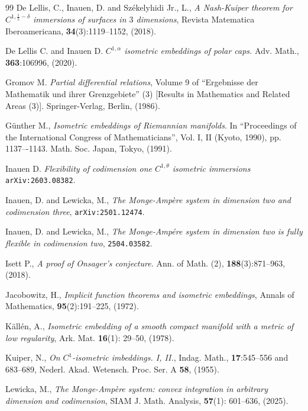 \documentclass[reqno,twoside,11pt]{amsart}
\numberwithin{equation}{section}
\theoremstyle{plain}
\theoremstyle{definition}
\begin{document}
\begin{thebibliography}{99}
 {\sc De Lellis, C., Inauen, D. and Sz\'ekelyhidi Jr.,
    L.}, {\em A Nash-Kuiper theorem for $C^{1,\frac{1}{5}-\delta}$ immersions of
surfaces in $3$ dimensions}, Revista Matematica Iberoamericana, {\bf
34}(3):1119--1152, (2018).

 {\sc De Lellis C. and Inauen D.}
 {\em $C^{1,\alpha}$ isometric embeddings of polar caps.}
 Adv. Math., {\bf 363}:106996, (2020).

 {\sc Gromov M.}
{\em Partial differential relations}, 
Volume 9 of ``Ergebnisse der Mathematik und ihrer
Grenzgebiete'' (3) [Results in Mathematics and Related Areas
(3)]. Springer-Verlag, Berlin, (1986).

 {\sc G\"unther M.},
{\em Isometric embeddings of Riemannian manifolds}. 
In ``Proceedings of the International
Congress of Mathematicians'', Vol. I, II (Kyoto, 1990), pp. 1137–-1143. Math. Soc. Japan, Tokyo,
(1991). 

 {\sc Inauen D.}
{\em Flexibility of codimension one $C^{1,\theta}$ isometric immersions}
{\tt arXiv:2603.08382}.

 {\sc Inauen, D. and Lewicka, M.},
{\em The Monge-Amp\`ere system in dimension two and codimension
  three}, {\tt arXiv:2501.12474}.
  
 {\sc Inauen, D. and Lewicka, M.},
{\em The Monge-Amp\'ere system in dimension two is fully flexible in
  codimension two}, {\tt 2504.03582}.

 {\sc Isett P.}, {\em A proof of Onsager’s conjecture.}
Ann. of Math. (2), {\bf 188}(3):871--963, (2018).

 {\sc Jacobowitz, H.}, {\em Implicit function theorems and isometric embeddings},
Annals of Mathematics, {\bf 95}(2):191--225, (1972).

 {\sc K\"all\'en, A.}, {\em Isometric embedding of a
    smooth compact manifold with a metric of 
  low regularity}, Ark. Mat. {\bf 16}(1): 29--50, (1978). 
  
 {\sc Kuiper, N.}, {\em On {$C^1$}-isometric imbeddings. {I}, {II}.},
Indag. Math., {\bf 17}:545--556 and 683--689,
Nederl. Akad. Wetensch. Proc. Ser. A {\bf 58}, (1955).

 {\sc Lewicka, M.}, 
{\em The Monge-Amp\`ere system: convex integration in arbitrary
  dimension and codimension}, SIAM J. Math. Analysis, {\bf 57}(1): 
601--636, (2025). 


\end{thebibliography}
\end{document}

